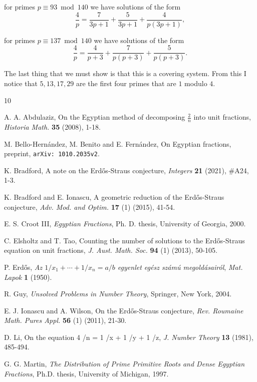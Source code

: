 \documentclass[10pt]{article}
\theoremstyle{definition}
\begin{document}
\noindent for primes $p \equiv 93 \bmod 140$  we have solutions of the form $$ \frac{4}{p} = \frac{7}{3p+1} + \frac{5}{3p+1} + \frac{4}{p(3p+1)},$$

\noindent for primes $p \equiv 137 \bmod 140$  we have solutions of the form $$ \frac{4}{p} = \frac{4}{p+3} + \frac{7}{p(p+3)} + \frac{5}{p(p+3)}.$$

The last thing that we must show is that this is a covering system.  From this I notice that $5, 13, 17, 29$  are the first four primes that are $1$ modulo $4$.



\begin{thebibliography}{10} \footnotesize

 A. A. Abdulaziz, On the Egyptian method of decomposing $\frac{2}{n}$ into unit fractions, {\it Historia Math.} {\bf 35} (2008), 1-18.

 M. Bello-Hern\'{a}ndez, M. Benito and E. Fern\'{a}ndez, On Egyptian fractions, preprint, {\tt arXiv: 1010.2035v2}.

 K. Bradford, A note on the Erd\H{o}s-Straus conjecture, {\it Integers} {\bf 21} (2021), \#A24, 1-3. 

 K. Bradford and E. Ionascu, A geometric reduction of the Erd\H{o}s-Straus conjecture, {\it Adv. Mod. and Optim.} {\bf 17} (1) (2015), 41-54. 

 E. S. Croot III, {\it Egyptian Fractions},  Ph. D. thesis, University of Georgia, 2000.

 C. Elsholtz and T. Tao, Counting the number of solutions to the Erd\H{o}s-Straus equation on unit fractions, {\it J. Aust. Math. Soc.} {\bf 94} (1) (2013), 50-105.

 P. Erd\H{o}s, {\it Az $1 \slash x_{1} + \cdots + 1 \slash x_{n} = a \slash b$  egyenlet eg\'{e}sz sz\'{a}m\'{u} megold\'{a}sair\'{o}l}, {\em Mat. Lapok} {\bf 1} (1950).

 R. Guy, {\it Unsolved Problems in Number Theory}, Springer, New York, 2004.

 E. J. Ionascu and A. Wilson, On the Erd\H{o}s-Straus conjecture,  {\it Rev. Roumaine Math. Pures Appl.} {\bf 56} (1) (2011), 21-30.

 D. Li, On the equation 4 \slash n = 1 \slash x + 1 \slash y + 1 \slash z, {\it J. Number Theory} {\bf 13} (1981), 485-494.

G. G. Martin, {\it The Distribution of Prime Primitive Roots and Dense Egyptian Fractions}, Ph.D. thesis, University of Michigan, 1997.


\end{thebibliography}
\end{document}
